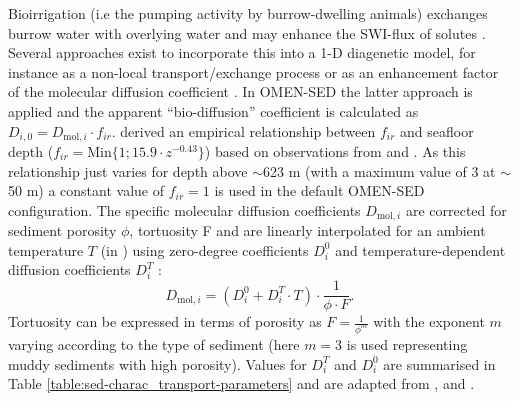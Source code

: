 \documentclass[gmd, manuscript]{copernicus}
\begin{document}
Bioirrigation (i.e the pumping activity by burrow-dwelling animals) exchanges burrow water with overlying water and may enhance the SWI-flux of solutes \citep{aller_importance_1984, aller1988benthic}. 
Several approaches exist to incorporate this into a 1-D diagenetic model, for instance as a non-local transport/exchange process \citep{boudreau_equivalence_1984, emerson_sediment-water_1984} 
or as an enhancement factor of the molecular diffusion coefficient \citep{devol_benthic_1993, soetaert_model_1996}. In OMEN-SED the latter approach is applied and the 
apparent ``bio-diffusion'' coefficient is calculated as $D_{i,0}=D_{\mathrm{mol},i}\cdot f_{ir}$. 
\citet{soetaert_model_1996} derived an empirical relationship between $f_{ir}$ and seafloor depth ($f_{ir} = \mathrm{Min}\{1; 15.9\cdot z^{-0.43}\}$) 
based on observations from \citet{archer_benthic_1992} and \citet{devol_benthic_1993}. As this relationship just varies for depth above $\sim$623 m (with a maximum 
value of 3 at $\sim$50 m) a constant value of $f_{ir}=1$ is used in the default OMEN-SED configuration. 
The specific molecular diffusion coefficients $D_{\mathrm{mol},i}$ are corrected for sediment porosity $\phi$, tortuosity F and are linearly interpolated for an ambient 
temperature $T$ (in \textcelsius) using zero-degree coefficients $D^0_i$ and temperature-dependent diffusion coefficients $D^T_i$ \citep[][]{soetaert_model_1996}:
\begin{equation*}
 D_{\mathrm{mol},i} = (D^0_i + D^T_i \cdot T )\cdot \frac{1}{\phi\cdot F}.
\end{equation*}
Tortuosity can be expressed in terms of porosity as $F = \frac{1}{\phi^m}$ \citep{ullman_diffusion_1982} with the exponent $m$ varying according to the type of sediment (here $m=3$ is used representing muddy sediments with high porosity). 
Values for $D^T_i$ and $D^0_i$ are summarised in Table \ref{table:sed-charac_transport-parameters} and are adapted from \citet{Li_diffusion_1974}, \citet{schulz_quantification_2006} and \citet{gypens_simple_2008}.
\end{document}
